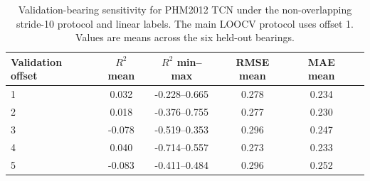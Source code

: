 \begin{table}[!ht]
\centering
\caption{Validation-bearing sensitivity for PHM2012 TCN under the non-overlapping stride-10 protocol and linear labels. The main LOOCV protocol uses offset 1. Values are means across the six held-out bearings.}
\label{tab:validation_sensitivity_nonoverlap}
\small
\begin{tabular}{lccccc}
\toprule
Validation offset & $R^2$ mean & $R^2$ min--max & RMSE mean & MAE mean \\
\midrule
1 & 0.032 & -0.228--0.665 & 0.278 & 0.234 \\
2 & 0.018 & -0.376--0.755 & 0.277 & 0.230 \\
3 & -0.078 & -0.519--0.353 & 0.296 & 0.247 \\
4 & 0.040 & -0.714--0.557 & 0.273 & 0.233 \\
5 & -0.083 & -0.411--0.484 & 0.296 & 0.252 \\
\bottomrule
\end{tabular}
\end{table}
